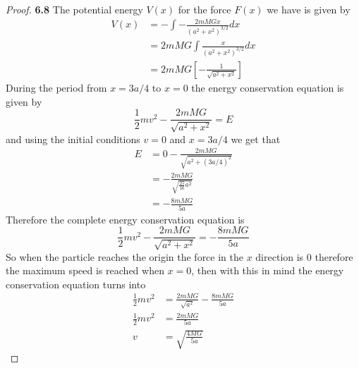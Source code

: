 \documentclass[11pt]{article}
\theoremstyle{definition}
\begin{document}
    \begin{proof}{\textbf{6.8}}
        The potential energy $V(x)$ for the force $F(x)$ we have is given by
        \begin{align*}
            V(x) &= - \int - \frac{2mMGx}{(a^2 + x^2)^{3/2}} dx\\
                 &= 2mMG \int \frac{x}{(a^2 + x^2)^{3/2}} dx\\
                 &= 2mMG \left[ -\frac{1}{\sqrt{a^2+x^2}}\right]
        \end{align*}
        During the period from $x=3a/4$ to $x=0$ the energy conservation equation is
        given by
        $$\frac{1}{2}mv^2 - \frac{2mMG}{\sqrt{a^2+x^2}} = E$$
        and using the initial conditions $v=0$ and $x=3a/4$ we get that
        \begin{align*}
            E &= 0 - \frac{2mMG}{\sqrt{a^2+(3a/4)^2}}\\
              &= - \frac{2mMG}{\sqrt{\frac{25}{16}a^2}}\\
              &= - \frac{8mMG}{5a}
        \end{align*}
        Therefore the complete energy conservation equation is
        $$\frac{1}{2}mv^2 - \frac{2mMG}{\sqrt{a^2+x^2}} = - \frac{8mMG}{5a}$$
        So when the particle reaches the origin the force in the $x$ direction is 0
        therefore the maximum speed is reached when $x=0$, then with this in mind 
        the energy conservation equation turns into
        \begin{align*}
            \frac{1}{2}mv^2 &= \frac{2mMG}{\sqrt{a^2}} - \frac{8mMG}{5a}\\
            \frac{1}{2}mv^2 &= \frac{2mMG}{5a}\\
                          v &= \sqrt{\frac{4MG}{5a}}
        \end{align*}
    \end{proof}
\cleardoublepage
\end{document}
